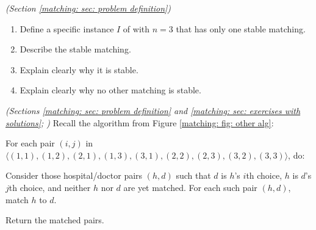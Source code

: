 \documentclass[11pt]{article}
\begin{document}






\newpage

\problem\emph{(Section \ref{matching: sec: problem definition})}

\begin{enumerate}[label=(\alph*)]

\item Define a specific instance $I$ of  with $n=3$
  that has only one stable matching.

\item Describe the stable matching.

\item Explain clearly why it is stable. 

\item Explain clearly why no other matching is stable.

\end{enumerate}






\newpage

\problem\emph{(Sections \ref{matching: sec: problem definition} and \ref{matching: sec: exercises with solutions}; )} 
Recall the algorithm from Figure \ref{matching: fig: other alg}:

\begin{myframed}

  \begin{steps}
    \step For each pair $(i,j)$ in $\langle (1,1), (1,2), (2,1), (1,3), (3,1), (2,2), (2,3), (3,2), (3,3) \rangle$, do:

    \begin{steps}
      \step Consider those hospital/doctor pairs $(h, d)$ such that $d$ is $h$'s $i$th choice,
      $h$ is $d$'s $j$th choice, and neither $h$ nor $d$ are yet matched.
      For each such pair $(h, d)$, match $h$ to $d$.
    \end{steps}

    \step Return the matched pairs.
  \end{steps}

\end{myframed}
\end{document}
